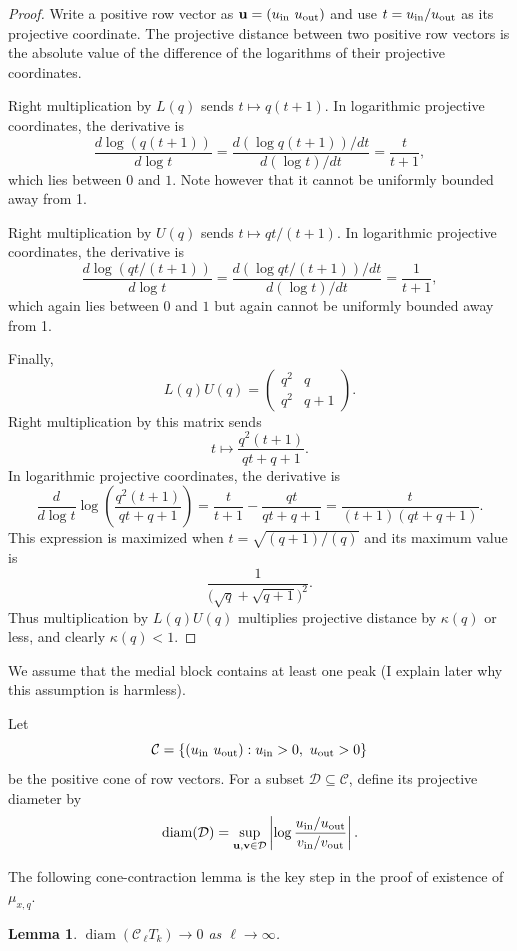 \documentclass[12pt]{article}
\theoremstyle{plain}
\newtheorem{lemma}[theorem]{Lemma}
\theoremstyle{definition}
\theoremstyle{remark}
\begin{document}
\begin{proof}
Write a positive row vector as \( {\bf u}=(u_{\rm in}\ u_{\rm out}) \)
and use \( t={u_{\rm in}}/{u_{\rm out}} \)
as its projective coordinate.  The projective distance between two
positive row vectors is the absolute value of the difference of the
logarithms of their projective coordinates.

Right multiplication by $L(q)$
sends \( t \mapsto q(t+1). \)
In logarithmic projective coordinates, the derivative is
\[ \frac{d\log(q(t+1))}{d\log t} = \frac{d(\log q(t+1))/dt}{d(\log t)/dt}
= \frac{t}{t+1}, \] which lies between $0$ and $1$.
Note however that it cannot be uniformly bounded away from 1.

Right multiplication by $U(q)$
sends \( t \mapsto qt/(t+1). \)
In logarithmic projective coordinates, the derivative is
\[ \frac{d\log(qt/(t+1))}{d\log t} = \frac{d(\log qt/(t+1))/dt}{d(\log t)/dt}
= \frac{1}{t+1}, \] which again lies between $0$ and $1$
but again cannot be uniformly bounded away from 1.

Finally,
\[ L(q)U(q)= \begin{pmatrix} q^2&q\\ q^2&q+1 \end{pmatrix}.  \]
Right multiplication by this matrix sends
\[ t \mapsto \frac{q^2(t+1)}{qt+q+1}.  \]
In logarithmic projective coordinates, the derivative is
\[ \frac{d}{d\log t} \log\left(\frac{q^2(t+1)}{qt+q+1}\right)
= \frac{t}{t+1}-\frac{qt}{qt+q+1} = \frac{t}{(t+1)(qt+q+1)}.  \]
This expression is maximized when \( t=\sqrt{(q+1)/(q)}\)
and its maximum value is
\[ \frac{1}{\bigl(\sqrt q+\sqrt{q+1}\bigr)^2}.  \]
Thus multiplication by $L(q)U(q)$ multiplies projective distance by 
$\kappa(q)$ or less, and clearly $\kappa(q) < 1$.
\end{proof}

We assume that the medial block contains at least one peak
(I explain later why this assumption is harmless).

Let \[ \mathcal C = 
\{(u_{\rm in}\ u_{\rm out}):u_{\rm in}>0,\ u_{\rm out}>0\} \]
be the positive cone of row vectors.
For a subset $\mathcal D\subseteq\mathcal C$, define its projective diameter by
\[ \operatorname{diam}(\mathcal D) =
\sup_{{\bf u},{\bf v}\in\mathcal D} \left| \log
\frac{u_{\rm in}/u_{\rm out}} {v_{\rm in}/v_{\rm out}} \right|.  \]

The following cone-contraction lemma is the key step
in the proof of existence of $\mu_{x,q}$.

\begin{lemma}
$\operatorname{diam}(\mathcal C\,{}_{\ell}T_k) \rightarrow 0$
as $\ell\rightarrow\infty$.
\end{lemma}
\end{document}

